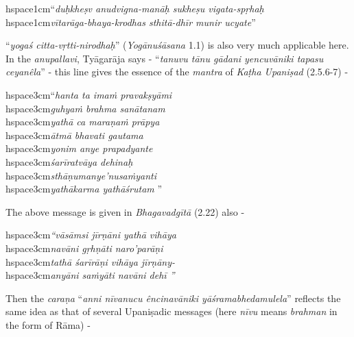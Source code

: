 \begin{myquote}
hspace{1cm}“\textit{duḥkheṣv anudvigna-manāḥ sukheṣu vigata-spṛhaḥ }\\hspace{1cm}\textit{vītarāga-bhaya-krodhas sthitā-dhīr munir ucyate}”  
\end{myquote}

“\textit{yogaś citta-vṛtti-nirodhaḥ}” (\textit{Yogānuśāsana} 1.1) is also very much applicable here. In the \textit{anupallavi}, Tyāgarāja says - “\textit{tanuvu tānu gādani yencuvāniki tapasu ceyanêla}” - this line gives the essence of the \textit{mantra} of \textit{Kaṭha Upaniṣad} (2.5.6-7) -

\begin{myquote}
hspace{3cm}“\textit{hanta ta imaṁ pravakṣyāmi}\\hspace{3cm}\textit{guhyaṁ brahma sanātanam }\\hspace{3cm}\textit{yathā ca maraṇaṁ prāpya}\\hspace{3cm}\textit{ātmā bhavati gautama }\\hspace{3cm}\textit{yonim anye prapadyante}\\hspace{3cm}\textit{śarīratvāya dehinaḥ }\\hspace{3cm}\textit{sthāṇumanye’nusaṁyanti}\\hspace{3cm}\textit{yathākarma yathāśrutam} ”
\end{myquote}

The above message is given in \textit{Bhagavadgītā} (2.22) also -

\begin{myquote}
hspace{3cm}\textit{“vāsāmsi jīrṇāni yathā vihāya}\\hspace{3cm}\textit{navāni gṛhṇāti naro’parāṇi }\\hspace{3cm}\textit{tathā śarīrāṇi vihāya jīrṇāny-}\\hspace{3cm}\textit{anyāni saṁyāti navāni dehī ”}
\end{myquote}

Then the \textit{caraṇa} “\textit{anni nīvanucu êncinavāniki yāśramabhedamulela}” reflects the same idea as that of several Upaniṣadic messages (here \textit{nīvu} means \textit{brahman} in the form of Rāma) -

